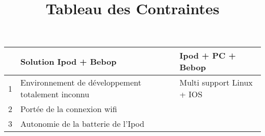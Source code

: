 \documentclass{article}
\date{}
\title{Tableau des Contraintes}
\begin{document}
\maketitle

\renewcommand{\arraystretch}{1.75}
\begin{center}
\begin{tabularx}{\linewidth}{|c|X|X|}
	\cline{2-3}
	\multicolumn{1}{l}{} \vline & Solution Ipod + Bebop & Ipod + PC + Bebop\\
	\hline
	1 & Environnement de développement totalement inconnu & Multi support Linux + IOS\\ 
	\hline
	2 & Portée de la connexion wifi & \\
	\hline
	3 & Autonomie de la batterie de l'Ipod & \\
	\hline
\end{tabularx}
\end{center}
\end{document}
